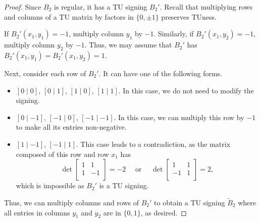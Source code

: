 \documentclass{article}
\theoremstyle{definition}
\begin{document}
\begin{proof}
    Since $B_{2}$ is regular, it has a TU signing $B_{2}'$. Recall that multiplying rows and columns of a TU matrix by factors in $\{0, \pm 1\}$ preserves TUness.

    If $B_{2}'(x_{1}, y_{1}) = -1$, multiply column $y_{1}$ by $-1$. Similarly, if $B_{2}'(x_{1}, y_{2}) = -1$, multiply column $y_{2}$ by $-1$. Thus, we may assume that $B_{2}'$ has $B_{2}'(x_{1}, y_{1}) = B_{2}'(x_{1}, y_{2}) = 1$.

    Next, consider each row of $B_{2}'$. It can have one of the following forms.
    \begin{itemize}
        \item $[0 \mid 0]$, $[0 \mid 1]$, $[1 \mid 0]$, $[1 \mid 1]$. In this case, we do not need to modify the signing.
        \item $[0 \mid -1]$, $[-1 \mid 0]$, $[-1 \mid -1]$. In this case, we can multiply this row by $-1$ to make all its entries non-negative.
        \item $[1 \mid -1]$, $[-1 \mid 1]$. This case leads to a contradiction, as the matrix composed of this row and row $x_{1}$ has
        \[
            \det \begin{bmatrix}
                1 & 1 \\
                1 & -1 \\
            \end{bmatrix} = -2
            \quad \text{ or } \quad
            \det \begin{bmatrix}
                1 & 1 \\
                -1 & 1 \\
            \end{bmatrix} = 2,
        \]
        which is impossible as $B_{2}'$ is a TU signing.
    \end{itemize}

    Thus, we can multiply columns and rows of $B_{2}'$ to obtain a TU signing $\tilde{B}_{2}$ where all entries in columns $y_{1}$ and $y_{2}$ are in $\{0, 1\}$, as desired.
\end{proof}
\end{document}
